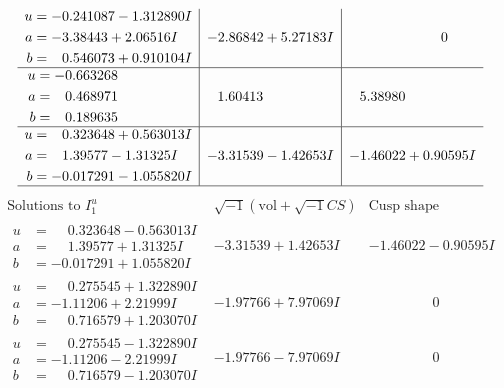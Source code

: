 \documentclass[1p]{elsarticle_modified}
\theoremstyle{definition}
\newcommand{\I}{\sqrt{-1}}
\begin{document}
$$\begin{array}{c|c|c}
\begin{aligned}
u &= -0.241087 - 1.312890 I \\
a &= -3.38443 + 2.06516 I \\
b &= \phantom{-}0.546073 + 0.910104 I\end{aligned}
 & -2.86842 + 5.27183 I & \phantom{-0.000000 } 0 \\ \hline\begin{aligned}
u &= -0.663268\phantom{ +0.000000I} \\
a &= \phantom{-}0.468971\phantom{ +0.000000I} \\
b &= \phantom{-}0.189635\phantom{ +0.000000I}\end{aligned}
 & \phantom{-}1.60413\phantom{ +0.000000I} & \phantom{-}5.38980\phantom{ +0.000000I} \\ \hline\begin{aligned}
u &= \phantom{-}0.323648 + 0.563013 I \\
a &= \phantom{-}1.39577 - 1.31325 I \\
b &= -0.017291 - 1.055820 I\end{aligned}
 & -3.31539 - 1.42653 I & -1.46022 + 0.90595 I\\
 \hline 
 \end{array}$$\newpage$$\begin{array}{c|c|c}  
\text{Solutions to }I^u_{1}& \I (\text{vol} + \sqrt{-1}CS) & \text{Cusp shape}\\
 \hline 
\begin{aligned}
u &= \phantom{-}0.323648 - 0.563013 I \\
a &= \phantom{-}1.39577 + 1.31325 I \\
b &= -0.017291 + 1.055820 I\end{aligned}
 & -3.31539 + 1.42653 I & -1.46022 - 0.90595 I \\ \hline\begin{aligned}
u &= \phantom{-}0.275545 + 1.322890 I \\
a &= -1.11206 + 2.21999 I \\
b &= \phantom{-}0.716579 + 1.203070 I\end{aligned}
 & -1.97766 + 7.97069 I & \phantom{-0.000000 } 0 \\ \hline\begin{aligned}
u &= \phantom{-}0.275545 - 1.322890 I \\
a &= -1.11206 - 2.21999 I \\
b &= \phantom{-}0.716579 - 1.203070 I\end{aligned}
 & -1.97766 - 7.97069 I & \phantom{-0.000000 } 0 \\ \hline\begin{aligned}

\end{aligned}
\end{array}$$
\end{document}
